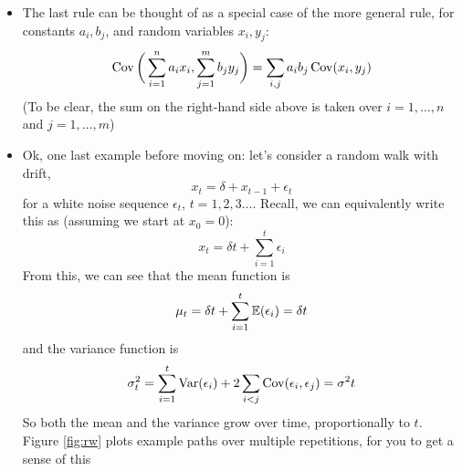 \documentclass{article}
\begin{document}
\begin{itemize}
\item The last rule can be thought of as a special case of the more general
  rule, for constants $a_i,b_j$, and random variables $x_i,y_j$: 
  \[
  \operatorname{Cov}\bigg( \sum_{i=1}^n a_i x_i , \sum_{j=1}^m b_j y_j  \bigg) 
  = \sum_{i,j} a_i b_j \operatorname{Cov}(x_i, y_j)
  \]
  (To be clear, the sum on the right-hand side above is taken over $i =
  1,\dots,n$ and $j = 1,\dots,m$) 

\item Ok, one last example before moving on: let's consider a random walk with
  drift,
  \[
  x_t = \delta + x_{t-1} + \epsilon_t
  \]
  for a white noise sequence $\epsilon_t$, $t = 1,2,3\dots$.  Recall, we can
  equivalently write this as (assuming we start at $x_0 = 0$):
  \[
  x_t = \delta t + \sum_{i=1}^t \epsilon_i 
  \] 
  From this, we can see that the mean function is 
  \[
  \mu_t = \delta t + \sum_{i=1}^t \mathbb{E}(\epsilon_i) = \delta t
  \]
  and the variance function is 
  \[
  \sigma^2_t = \sum_{i=1}^t \operatorname{Var}(\epsilon_i) + 2 \sum_{i<j} \operatorname{Cov}(\epsilon_i,
  \epsilon_j) = \sigma^2 t
  \]
  So both the mean and the variance grow over time, proportionally to $t$. 
  Figure \ref{fig:rw} plots example paths over multiple repetitions, for you to
  get a sense of this
\end{itemize}
\end{document}
